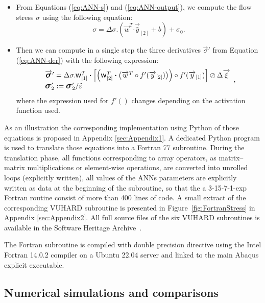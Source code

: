 \documentclass[algorithms,article,submit,pdftex,oneauthors]{Definitions/mdpi}
\DeclareRobustCommand{\w}{\mbox{\large\ensuremath{\mathsf{w}}}}
\DeclareRobustCommand{\dotp}{\boldsymbol{\cdot}}
\DeclareRobustCommand{\lay}[1]{_{[#1]}}
\DeclareRobustCommand{\mdot}[1]{\accentset{\mbox{\bfseries .}}{#1}}
\DeclareRobustCommand{\Sig}{\mbox{\large\ensuremath{\boldsymbol{\sigma}}}}
\begin{document}
\begin{itemize}
\item From Equations (\ref{eq:ANN-s}) and (\ref{eq:ANN-output}), we compute the flow stress $\sigma$ using the following equation:
\begin{equation}
\sigma = \Delta\sigma.\left(\overrightarrow{w}^T \dotp \overrightarrow{\hat{y}}\lay{2} + b\right) + \sigma_{0}.\label{eq:ANNi6}
\end{equation}
\item Then we can compute in a single step the three derivatives $\overrightarrow{\sigma}'$ from Equation (\ref{eq:ANN-der}) with the following expression:
\begin{equation}
\begin{array}{l}
\overrightarrow{\Sig}' = \Delta\sigma.\w\lay{1}^T \dotp\left[\left(\w\lay{2}^T \dotp \left(\overrightarrow{w}^T \circ f'(\overrightarrow{y}\lay{2})\right)\right) \circ f'(\overrightarrow{y}\lay{1})\right] \oslash \Delta\overrightarrow{\xi}\\
\Sig_{2}' := \Sig_{2}' / \mdot{\varepsilon}
\end{array},\label{eq:ANNi7}
\end{equation}
where the expression used for $f'()$ changes depending on the activation function used.
\end{itemize}
As an illustration the corresponding implementation using Python of those equations is proposed in Appendix \ref{sec:Appendix1}.
A dedicated Python program is used to translate those equations into a Fortran 77 subroutine.
During the translation phase, all functions corresponding to array operators, as matrix--matrix multiplications or element-wise operations, are converted into unrolled loops (explicitly written), all values of the ANNs parameters are explicitly written as data at the beginning of the subroutine, so that the a 3-15-7-1-exp Fortran routine consist of more than 400 lines of code.
A small extract of the corresponding VUHARD subroutine is presented in Figure~\ref{fig:FortranStress} in Appendix \ref{sec:Appendix2}.
All full source files of the six VUHARD subroutines is available in the Software Heritage Archive~\cite{Pantale-2023-SSF}.

The Fortran subroutine is compiled with double precision directive using the Intel Fortran 14.0.2 compiler on a Ubuntu 22.04 server and linked to the main Abaqus explicit executable.

\subsection{Numerical simulations and comparisons}\label{subsec:Num-sim}
\end{document}

